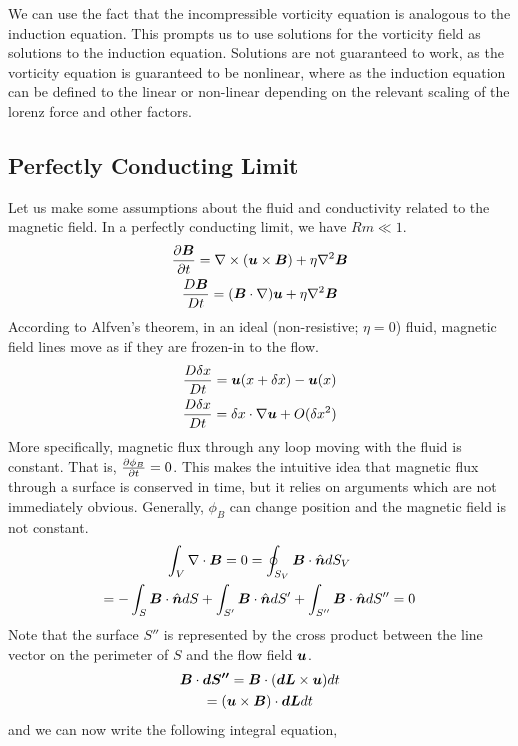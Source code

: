 \documentclass{article}
\begin{document}
We can use the fact that the incompressible vorticity equation is analogous to
the induction equation. This prompts us to use solutions for the vorticity field
as solutions to the induction equation. Solutions are not guaranteed to work, as
the vorticity equation is guaranteed to be nonlinear, where as the induction
equation can be defined to the linear or non-linear depending on the relevant
scaling of the lorenz force and other factors. 

\subsection{Perfectly Conducting Limit}

Let us make some assumptions about the fluid and conductivity related to the
magnetic field. In a perfectly conducting limit, we have $Rm \ll 1$. 
\begin{gather*}
    \frac{\partial \boldsymbol{B}}{\partial t} = \nabla\times(\boldsymbol{u}\times\boldsymbol{B}) + \eta\nabla^2\boldsymbol{B}\\
    \frac{D \boldsymbol{B}}{D t} = (\boldsymbol{B}\cdot\nabla)\boldsymbol{u} + \eta\nabla^2\boldsymbol{B}
\end{gather*}
According to Alfven's theorem, in an ideal (non-resistive; $\eta = 0$) fluid,
magnetic field lines move as if they are frozen-in to the flow. 
\begin{gather*}
    \frac{D \delta x}{D t} = \boldsymbol{u}(x + \delta x) - \boldsymbol{u}(x) \\
    \frac{D \delta x}{D t} = \delta x \cdot \nabla \boldsymbol{u} + O(\delta x^2)
\end{gather*}
More specifically, magnetic flux through any loop moving with the fluid is constant.
That is, $\frac{\partial \phi_B}{\partial t} = 0$. This makes the intuitive idea that magnetic flux
through a surface is conserved in time, but it relies on arguments which are not
immediately obvious. Generally, $\phi_B$ can change position and the magnetic
field is not constant. 
\begin{gather*}
    \int_V \nabla \cdot{\boldsymbol{B}} = 0 = \oint_{S_V} \boldsymbol{B}\cdot\hat{\boldsymbol{n}}dS_V\\
    = -\int_S \boldsymbol{B}\cdot\hat{\boldsymbol{n}} dS + \int_{S'}\boldsymbol{B}\cdot\hat{\boldsymbol{n}} dS' + \int_{S''}
    \boldsymbol{B}\cdot\hat{\boldsymbol{n}} dS'' = 0
\end{gather*}
Note that the surface $S''$ is represented by the cross product between the line
vector on the perimeter of $S$ and the flow field $\boldsymbol{u}$. 
\begin{gather*}
    \boldsymbol{B} \cdot\boldsymbol{dS''} = \boldsymbol{B} \cdot (\boldsymbol{dL} \times \boldsymbol{u}) dt\\
    = (\boldsymbol{u}\times\boldsymbol{B}) \cdot \boldsymbol{dL}dt
\end{gather*}
and we can now write the following integral equation,
\end{document}

